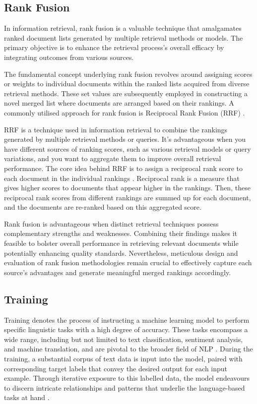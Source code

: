 \subsection{Rank Fusion}
In information retrieval, rank fusion is a valuable technique that amalgamates ranked document lists generated by multiple retrieval methods or models. The primary objective is to enhance the retrieval process's overall efficacy by integrating outcomes from various sources.

The fundamental concept underlying rank fusion revolves around assigning scores or weights to individual documents within the ranked lists acquired from diverse retrieval methods. These set values are subsequently employed in constructing a novel merged list where documents are arranged based on their rankings. A commonly utilised approach for rank fusion is Reciprocal Rank Fusion (RRF) \cite{rankfusion}.

RRF is a technique used in information retrieval to combine the rankings generated by multiple retrieval methods or queries. It's advantageous when you have different sources of ranking scores, such as various retrieval models or query variations, and you want to aggregate them to improve overall retrieval performance. The core idea behind RRF is to assign a reciprocal rank score to each document in the individual rankings \cite{rankfusion}. Reciprocal rank is a measure that gives higher scores to documents that appear higher in the rankings. Then, these reciprocal rank scores from different rankings are summed up for each document, and the documents are re-ranked based on this aggregated score.

Rank fusion is advantageous when distinct retrieval techniques possess complementary strengths and weaknesses. Combining their findings makes it feasible to bolster overall performance in retrieving relevant documents while potentially enhancing quality standards. Nevertheless, meticulous design and evaluation of rank fusion methodologies remain crucial to effectively capture each source's advantages and generate meaningful merged rankings accordingly.

\subsection{Training}
Training denotes the process of instructing a machine learning model to perform specific linguistic tasks with a high degree of accuracy. These tasks encompass a wide range, including but not limited to text classification, sentiment analysis, and machine translation, and are pivotal to the broader field of NLP \cite{bert}. During the training, a substantial corpus of text data is input into the model, paired with corresponding target labels that convey the desired output for each input example. Through iterative exposure to this labelled data, the model endeavours to discern intricate relationships and patterns that underlie the language-based tasks at hand \cite{nlp}.

